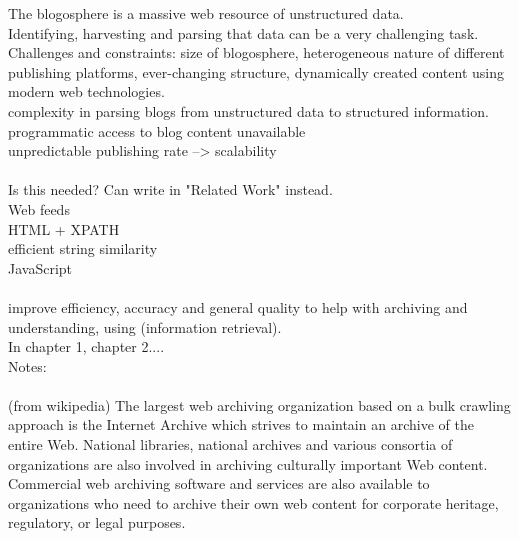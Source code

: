 The blogosphere is a massive web resource of unstructured data.\\
Identifying, harvesting and parsing that data can be a very challenging task.\\
Challenges and constraints: size of blogosphere, heterogeneous nature of different publishing platforms, ever-changing structure, dynamically created content using modern web technologies.\\
complexity in parsing blogs from unstructured data to structured information.\\
programmatic access to blog content unavailable\\
unpredictable publishing rate --> scalability\\
\\
Is this needed? Can write in "Related Work" instead.
\\
Web feeds\\
HTML + XPATH\\
efficient string similarity\\
JavaScript\\
\\
improve efficiency, accuracy and general quality to help with archiving and understanding, using (information retrieval).
\\
In chapter 1, chapter 2....
\\
Notes:\\
\\
(from wikipedia) The largest web archiving organization based on a bulk crawling approach is the Internet Archive which strives to maintain an archive of the entire Web. National libraries, national archives and various consortia of organizations are also involved in archiving culturally important Web content. Commercial web archiving software and services are also available to organizations who need to archive their own web content for corporate heritage, regulatory, or legal purposes.
\\
\\
